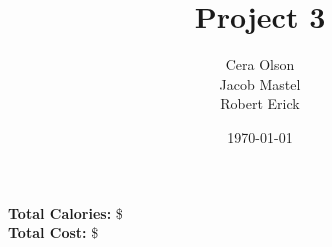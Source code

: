 \documentclass[11pt]{article}
\title{Project 3}
\author{Cera Olson\\Jacob Mastel\\Robert Erick}
\date{\today}
\begin{document}
	\maketitle\textbf{Total Calories:} \$ \\
\textbf{Total Cost:} \$
	
	
\end{document}
